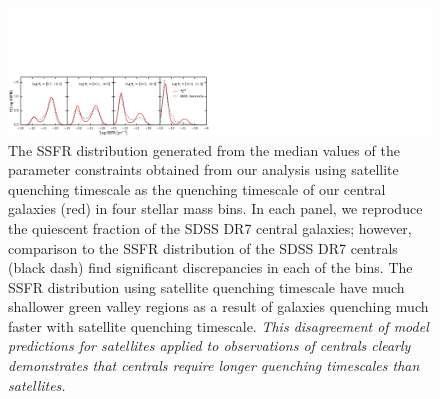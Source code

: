 \documentclass[iop,apj,tighten,twocolappendix,numberedappendix]{emulateapj}
\begin{document}
\begin{figure}
\begin{center}
\includegraphics[width=\textwidth]{figs/SSFR_ABC_posterior_SatABC_TinkerFq_satellite_prior.pdf}
\caption{The SSFR distribution generated from the median values of the 
parameter constraints obtained from our analysis using \cite{Wetzel:2013aa} 
satellite quenching timescale as the quenching timescale of our 
central galaxies (red) in four stellar mass bins. In each panel, 
we reproduce the quiescent fraction of the SDSS DR7 central galaxies;
however, comparison to the SSFR distribution of the SDSS DR7 centrals 
(black dash) find significant discrepancies in each of the bins. 
The SSFR distribution using satellite quenching timescale have much 
shallower green valley regions as a result of galaxies quenching much 
faster with satellite quenching timescale. {\em This disagreement of 
model predictions for satellites applied to observations of centrals 
clearly demonstrates that centrals require longer quenching timescales 
than satellites.} 
}
\label{fig:ssfr_tau_sat}
\end{center}
\end{figure}
\end{document}
